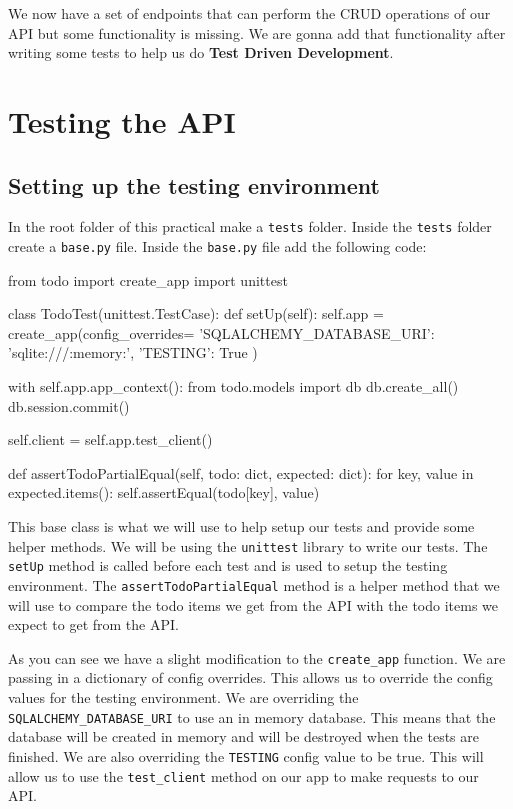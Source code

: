 \documentclass{csse4400}
\begin{document}
We now have a set of endpoints that can perform the CRUD operations of our API but some functionality is missing. We are gonna add that functionality after writing some tests to help us do \textbf{Test Driven Development}.

\section{Testing the API}

\subsection{Setting up the testing environment}

In the root folder of this practical make a \texttt{tests} folder. Inside the \texttt{tests} folder create a \texttt{base.py} file. Inside the \texttt{base.py} file add the following code:

\begin{code}[language=python,numbers=none]{}
  from todo import create_app
  import unittest
  
  
  class TodoTest(unittest.TestCase):
      def setUp(self):
          self.app = create_app(config_overrides={
              'SQLALCHEMY_DATABASE_URI': 'sqlite:///:memory:',
              'TESTING': True
          })
  
          with self.app.app_context():
              from todo.models import db
              db.create_all()
              db.session.commit()
          
          self.client = self.app.test_client()
  
      def assertTodoPartialEqual(self, todo: dict, expected: dict):
          for key, value in expected.items():
              self.assertEqual(todo[key], value)
\end{code}


This base class is what we will use to help setup our tests and provide some helper methods. We will be using the \texttt{unittest} library to write our tests. The \texttt{setUp} method is called before each test and is used to setup the testing environment. The \texttt{assertTodoPartialEqual} method is a helper method that we will use to compare the todo items we get from the API with the todo items we expect to get from the API.

As you can see we have a slight modification to the \texttt{create\_app} function. We are passing in a dictionary of config overrides. This allows us to override the config values for the testing environment. We are overriding the \texttt{SQLALCHEMY\_DATABASE\_URI} to use an in memory database. This means that the database will be created in memory and will be destroyed when the tests are finished. We are also overriding the \texttt{TESTING} config value to be true. This will allow us to use the \texttt{test\_client} method on our app to make requests to our API.
\end{document}
